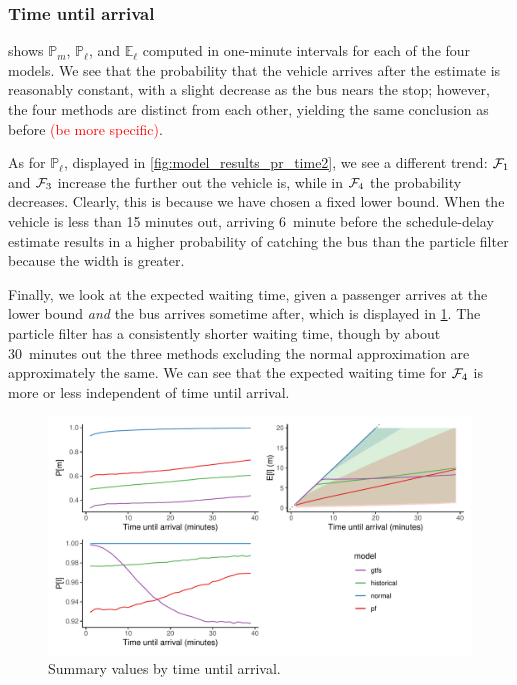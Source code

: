 \subsubsection{Time until arrival}

 shows $\mathbb{P}_m$, $\mathbb{P}_\ell$, and $\mathbb{E}_\ell$ computed in one-minute intervals for each of the four models. We see that the probability that the vehicle arrives after the estimate is reasonably constant, with a slight decrease as the bus nears the stop; however, the four methods are distinct from each other, yielding the same conclusion as before \textcolor{red}{(be more specific)}.

As for $\mathbb{P}_\ell$, displayed in \cref{fig:model_results_pr_time2}, we see a different trend: $\mathcal{F}_1$ and $\mathcal{F}_3$ increase the further out the vehicle is, while in $\mathcal{F}_4$ the probability decreases. Clearly, this is because we have chosen a fixed lower bound. When the vehicle is less than 15 minutes out, arriving 6~minute before the schedule-delay estimate results in a higher probability of catching the bus than the particle filter because the width is greater.


Finally, we look at the expected waiting time, given a passenger arrives at the lower bound \emph{and} the bus arrives sometime after, which is displayed in \cref{fig:model_results_pr_time}. The particle filter has a consistently shorter waiting time, though by about 30~minutes out the three methods excluding the normal approximation are approximately the same. We can see that the expected waiting time for $\mathcal{F}_4$ is more or less independent of time until arrival.



\begin{knitrout}\small
{}\color{fgcolor}\begin{figure}
\includegraphics[width=\textwidth]{figure/model_results_pr_time-1} \caption[Summary values by time until arrival]{Summary values by time until arrival.}\label{fig:model_results_pr_time}
\end{figure}


\end{knitrout}


